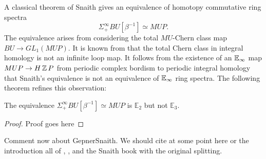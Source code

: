 
A classical theorem of Snaith \cite{SnaithOriginal} gives an equivalence of homotopy commutative ring spectra $$\Sigma^{\infty}_+ BU [\beta^{-1}] \simeq MUP.$$  The equivalence arises from considering the total $MU$-Chern class map $BU \to GL_1(MUP).$  It is known from \cite{SnaithNotMultiplicative} that the total Chern class in integral homology is not an infinite loop map.  It follows from the existence of an $\operatorname{\mathbb{E}}_\infty$ map $MUP \to H\operatorname{\mathbb{Z}} P$ from periodic complex bordism to periodic integral homology that Snaith's equivalence is not an equivalence of $\operatorname{\mathbb{E}}_\infty$ ring spectra.  The following theorem refines this observation:



\begin{thm}
The equivalence $\Sigma^{\infty}_+ BU [\beta^{-1}] \simeq MUP$ is $\mathbb{E}_2$ but not $\mathbb{E}_3$.
\end{thm}

\begin{proof}
Proof goes here
\end{proof}

Comment now about GepnerSnaith.
We should cite at some point here or the introduction all of \cite{SnaithNotMultiplicative},  \cite{GepnerSnaith}, and the Snaith book with the original splitting.
